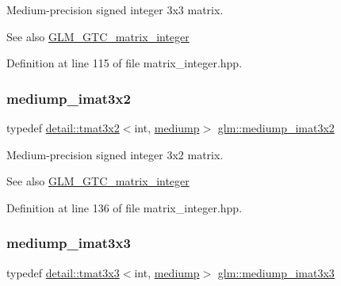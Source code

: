 Medium-\/precision signed integer 3x3 matrix. \begin{DoxySeeAlso}{See also}
\hyperlink{group__gtc__matrix__integer}{G\+L\+M\+\_\+\+G\+T\+C\+\_\+matrix\+\_\+integer} 
\end{DoxySeeAlso}


Definition at line 115 of file matrix\+\_\+integer.\+hpp.

\mbox{\label{group__gtc__matrix__integer_ga2a90775c74656b8a825f24d510f0ea5d}} 
\subsubsection{\texorpdfstring{mediump\+\_\+imat3x2}{mediump\_imat3x2}}
{\footnotesize\ttfamily typedef \hyperlink{structglm_1_1detail_1_1tmat3x2}{detail\+::tmat3x2}$<$int, \hyperlink{namespaceglm_a0f04f086094c747d227af4425893f545a6416f3ea0c9025fb21ed50c4d6620482}{mediump}$>$ \hyperlink{group__gtc__matrix__integer_ga2a90775c74656b8a825f24d510f0ea5d}{glm\+::mediump\+\_\+imat3x2}}

Medium-\/precision signed integer 3x2 matrix. \begin{DoxySeeAlso}{See also}
\hyperlink{group__gtc__matrix__integer}{G\+L\+M\+\_\+\+G\+T\+C\+\_\+matrix\+\_\+integer} 
\end{DoxySeeAlso}


Definition at line 136 of file matrix\+\_\+integer.\+hpp.

\mbox{\label{group__gtc__matrix__integer_gac5ee8dc182055bb0a00a90c031d4a714}} 
\subsubsection{\texorpdfstring{mediump\+\_\+imat3x3}{mediump\_imat3x3}}
{\footnotesize\ttfamily typedef \hyperlink{structglm_1_1detail_1_1tmat3x3}{detail\+::tmat3x3}$<$int, \hyperlink{namespaceglm_a0f04f086094c747d227af4425893f545a6416f3ea0c9025fb21ed50c4d6620482}{mediump}$>$ \hyperlink{group__gtc__matrix__integer_gac5ee8dc182055bb0a00a90c031d4a714}{glm\+::mediump\+\_\+imat3x3}}

